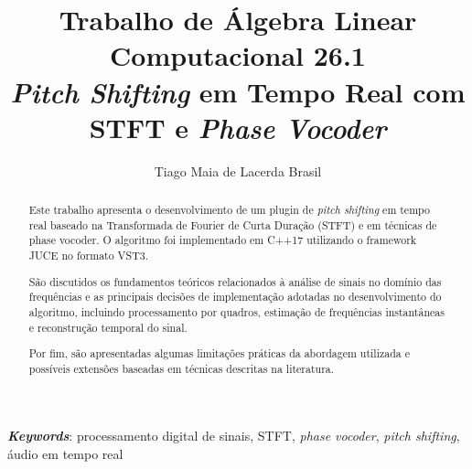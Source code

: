 



\title{
Trabalho de Álgebra Linear Computacional \hspace{2.0ex} 26.1\\
\textit{Pitch Shifting} em Tempo Real com STFT e \textit{Phase Vocoder}
}

\author{
    Tiago Maia de Lacerda Brasil
}

\address{
    Instituto de Computação -- Universidade Federal Fluminense (UFF)\\
    Niterói -- RJ -- Brasil -- 24210-346
}
\maketitle

\begin{abstract}
    Este trabalho apresenta o desenvolvimento de um plugin de \textit{pitch shifting} em tempo real baseado na Transformada de Fourier de Curta Duração (STFT) e em técnicas de phase vocoder. O algoritmo foi implementado em C++17 utilizando o framework JUCE no formato VST3.

    São discutidos os fundamentos teóricos relacionados à análise de sinais no domínio das frequências e as principais decisões de implementação adotadas no desenvolvimento do algoritmo, incluindo processamento por quadros, estimação de frequências instantâneas e reconstrução temporal do sinal.

    Por fim, são apresentadas algumas limitações práticas da abordagem utilizada e possíveis extensões baseadas em técnicas descritas na literatura.
\end{abstract}

\noindent\textit{\textbf{Keywords}}: processamento digital de sinais, STFT, \textit{phase vocoder}, \textit{pitch shifting}, áudio em tempo real

